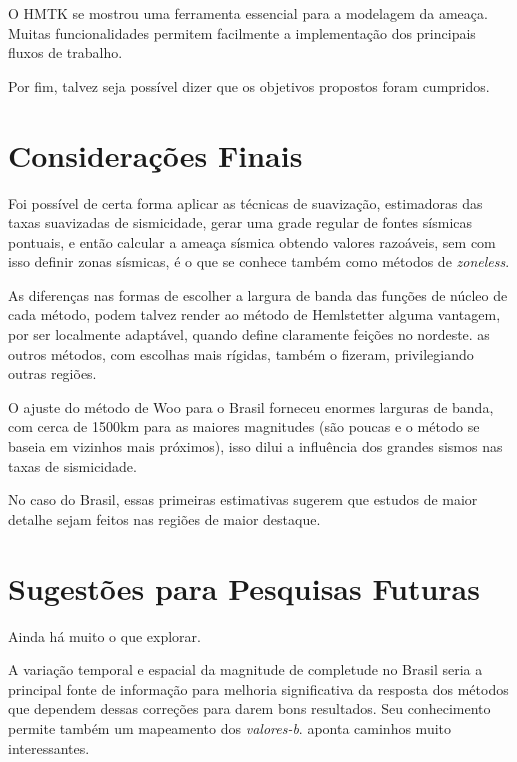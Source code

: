 O HMTK se mostrou uma ferramenta essencial para a modelagem da ameaça. 
Muitas funcionalidades permitem facilmente a implementação dos principais fluxos de trabalho.

Por fim, talvez seja possível dizer que os objetivos propostos foram cumpridos.

\section{Considerações Finais} 

Foi possível de certa forma aplicar as técnicas de suavização, estimadoras das taxas suavizadas de sismicidade, 
gerar uma grade regular de fontes sísmicas pontuais, e então calcular a ameaça sísmica obtendo 
valores razoáveis, sem com isso definir zonas sísmicas, é o que se conhece também como métodos de \emph{zoneless}.

As diferenças nas formas de escolher a largura de banda das funções de núcleo de cada método,
podem talvez render ao método de Hemlstetter alguma vantagem, por ser localmente adaptável,
quando define claramente feições no nordeste. as outros métodos, com escolhas mais rígidas,
também o fizeram, privilegiando outras regiões.

O ajuste do método de Woo para o Brasil forneceu enormes larguras de banda, com cerca de 1500km para
as maiores magnitudes (são poucas e o método se baseia em vizinhos mais próximos), isso dilui
a influência dos grandes sismos nas taxas de sismicidade.

No caso do Brasil, essas primeiras estimativas sugerem que estudos de maior detalhe 
sejam feitos nas regiões de maior destaque.



\section{Sugestões para Pesquisas Futuras} 

Ainda há muito o que explorar.

A variação temporal e espacial da magnitude de completude no Brasil seria a principal fonte de informação 
para melhoria significativa da resposta dos métodos que dependem dessas correções para darem bons resultados.
Seu conhecimento permite também um mapeamento dos \emph{valores-b}. \citet{vorobieva_2013} aponta caminhos muito
interessantes.

